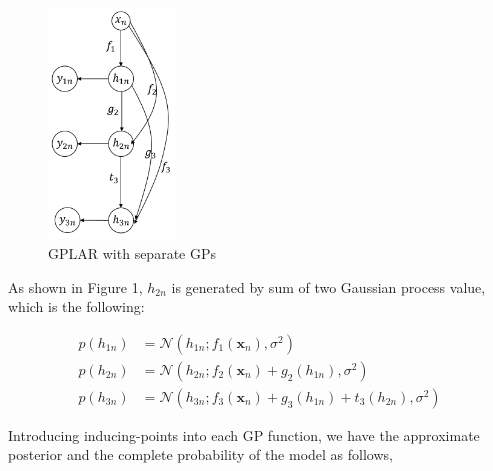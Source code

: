 \documentclass{article}
\begin{document}
\begin{figure}[H]
    \centering
    \includegraphics[width=0.3\textwidth]{new.PNG}
    \caption{GPLAR with separate GPs}
\end{figure}

As shown in Figure 1, $h_{2n}$ is generated by sum of two Gaussian process value, which is the following:

\begin{align*}
    p(h_{1n}) &= \mathcal{N}(h_{1n};f_1(\mathbf{x}_n), \sigma^2)\\
    p(h_{2n}) &= \mathcal{N}(h_{2n};f_2(\mathbf{x}_n)+g_2(h_{1n}), \sigma^2)\\
    p(h_{3n}) &= \mathcal{N}(h_{3n};f_3(\mathbf{x}_n)+g_3(h_{1n})+t_3(h_{2n}), \sigma^2)
\end{align*}

Introducing inducing-points into each GP function, we have the approximate posterior and the complete probability of the model as follows,
\end{document}
